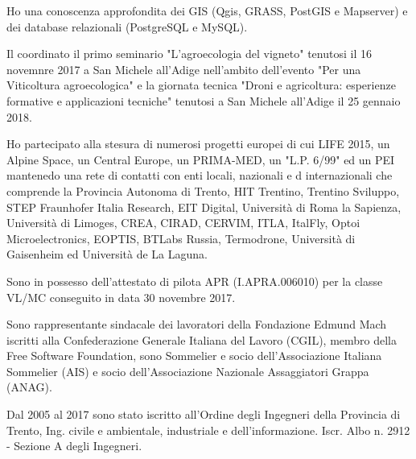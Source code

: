 \documentclass{curriculum}
\begin{document}
        Ho una conoscenza approfondita dei GIS (Qgis, GRASS, PostGIS e Mapserver) e dei database relazionali (PostgreSQL e MySQL). 
        
        Il coordinato il primo seminario "L'agroecologia del vigneto" tenutosi il 16 novemnre 2017 a San Michele all'Adige nell'ambito dell'evento "Per una Viticoltura agroecologica" e la giornata tecnica "Droni e agricoltura: esperienze formative e applicazioni tecniche" tenutosi a San Michele all'Adige il 25 gennaio 2018.
        
        Ho partecipato alla stesura di numerosi progetti europei di cui  LIFE 2015, un Alpine Space, un Central Europe, un PRIMA-MED, un "L.P. 6/99" ed un PEI mantenedo una rete di contatti con enti locali, nazionali e d internazionali che comprende la Provincia Autonoma di Trento, HIT Trentino, Trentino Sviluppo, STEP Fraunhofer Italia Research, EIT Digital, Università di Roma la Sapienza, Università di Limoges, CREA, CIRAD, CERVIM, ITLA, ItalFly, Optoi Microelectronics, EOPTIS, BTLabs Russia, Termodrone, Università di Gaisenheim ed Università de La Laguna.
        
        Sono in possesso dell'attestato di pilota APR (I.APRA.006010) per la classe VL/MC conseguito in data 30 novembre 2017.
        
        Sono rappresentante sindacale dei lavoratori della Fondazione Edmund Mach iscritti alla Confederazione Generale Italiana del Lavoro (CGIL), membro della Free Software Foundation, sono Sommelier e socio dell'Associazione Italiana Sommelier (AIS) e socio dell'Associazione Nazionale Assaggiatori Grappa (ANAG).
        
        Dal 2005 al 2017 sono stato iscritto all'Ordine degli Ingegneri della Provincia di Trento, Ing. civile e ambientale, industriale e dell'informazione. Iscr. Albo n. 2912 - Sezione A degli Ingegneri. 
        
\end{document}
